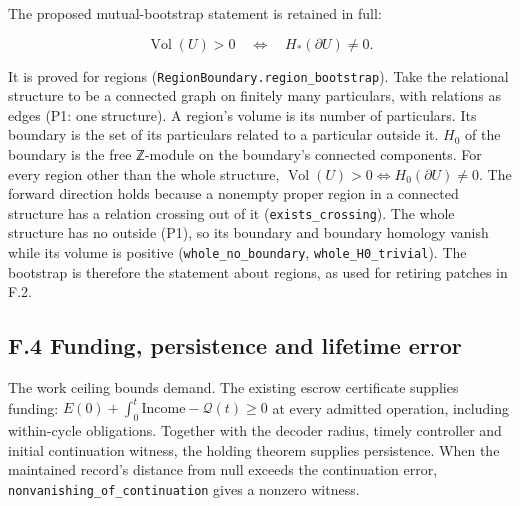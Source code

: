 \documentclass[
]{article}
\newcounter{none} %
\begin{document}
The proposed mutual-bootstrap statement is retained in full:

\[
\operatorname{Vol}(U)>0\quad\Longleftrightarrow\quad H_*(\partial U)\ne0.
\]

It is proved for regions
(\texttt{R\allowbreak{}e\allowbreak{}g\allowbreak{}i\allowbreak{}o\allowbreak{}n\allowbreak{}B\allowbreak{}o\allowbreak{}u\allowbreak{}n\allowbreak{}d\allowbreak{}a\allowbreak{}r\allowbreak{}y\allowbreak{}.\allowbreak{}r\allowbreak{}e\allowbreak{}g\allowbreak{}i\allowbreak{}o\allowbreak{}n\allowbreak{}\_\allowbreak{}b\allowbreak{}o\allowbreak{}o\allowbreak{}t\allowbreak{}s\allowbreak{}t\allowbreak{}r\allowbreak{}a\allowbreak{}p}).
Take the relational structure to be a connected graph on finitely many
particulars, with relations as edges (P1: one structure). A region's
volume is its number of particulars. Its boundary is the set of its
particulars related to a particular outside it. \(H_0\) of the boundary
is the free ℤ-module on the boundary's connected components. For every
region other than the whole structure,
\(\operatorname{Vol}(U)>0\Leftrightarrow H_0(\partial U)\ne0\). The
forward direction holds because a nonempty proper region in a connected
structure has a relation crossing out of it (\texttt{exists\_crossing}).
The whole structure has no outside (P1), so its boundary and boundary
homology vanish while its volume is positive
(\texttt{w\allowbreak{}h\allowbreak{}o\allowbreak{}l\allowbreak{}e\allowbreak{}\_\allowbreak{}n\allowbreak{}o\allowbreak{}\_\allowbreak{}b\allowbreak{}o\allowbreak{}u\allowbreak{}n\allowbreak{}d\allowbreak{}a\allowbreak{}r\allowbreak{}y},
\texttt{whole\_H0\_trivial}). The bootstrap is therefore the statement
about regions, as used for retiring patches in F.2.

\subsection{F.4 Funding, persistence and lifetime
error}\label{f.4-funding-persistence-and-lifetime-error}

The work ceiling bounds demand. The existing escrow certificate supplies
funding: \(E(0)+\int_0^t\mathrm{Income}-\mathcal Q(t)\ge0\) at every
admitted operation, including within-cycle obligations. Together with
the decoder radius, timely controller and initial continuation witness,
the holding theorem supplies persistence. When the maintained record's
distance from null exceeds the continuation error,
\texttt{n\allowbreak{}o\allowbreak{}n\allowbreak{}v\allowbreak{}a\allowbreak{}n\allowbreak{}i\allowbreak{}s\allowbreak{}h\allowbreak{}i\allowbreak{}n\allowbreak{}g\allowbreak{}\_\allowbreak{}o\allowbreak{}f\allowbreak{}\_\allowbreak{}c\allowbreak{}o\allowbreak{}n\allowbreak{}t\allowbreak{}i\allowbreak{}n\allowbreak{}u\allowbreak{}a\allowbreak{}t\allowbreak{}i\allowbreak{}o\allowbreak{}n}
gives a nonzero witness.
\end{document}
